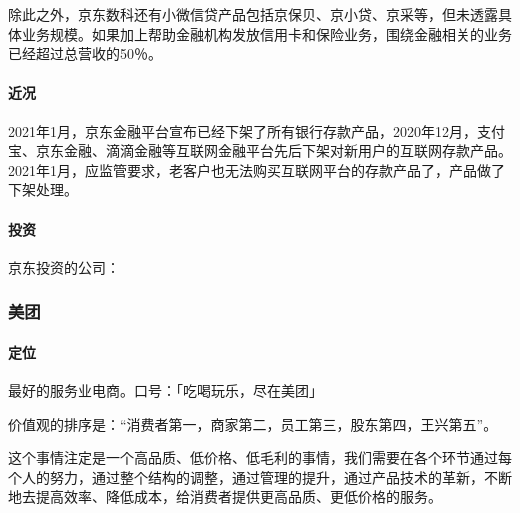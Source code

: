 \documentclass[letterpaper,10pt,english]{sphinxmanual}
\begin{document}
除此之外，京东数科还有小微信贷产品包括京保贝、京小贷、京采等，但未透露具体业务规模。如果加上帮助金融机构发放信用卡和保险业务，围绕金融相关的业务已经超过总营收的50％。%
\begin{footnote}[1024]\sphinxAtStartFootnote
{}
%
\end{footnote}


\paragraph{近况}
\label{\detokenize{chapter_AI_company/jd:id9}}
2021年1月，京东金融平台宣布已经下架了所有银行存款产品，2020年12月，支付宝、京东金融、滴滴金融等互联网金融平台先后下架对新用户的互联网存款产品。2021年1月，应监管要求，老客户也无法购买互联网平台的存款产品了，产品做了下架处理。%
\begin{footnote}[1025]\sphinxAtStartFootnote
{}
%
\end{footnote}


\paragraph{投资}
\label{\detokenize{chapter_AI_company/jd:id10}}
京东投资的公司：


\subsubsection{美团}
\label{\detokenize{chapter_AI_company/meituan:id1}}\label{\detokenize{chapter_AI_company/meituan::doc}}

\paragraph{定位}
\label{\detokenize{chapter_AI_company/meituan:id2}}
最好的服务业电商。口号：「吃喝玩乐，尽在美团」

价值观的排序是：“消费者第一，商家第二，员工第三，股东第四，王兴第五”。

这个事情注定是一个高品质、低价格、低毛利的事情，我们需要在各个环节通过每个人的努力，通过整个结构的调整，通过管理的提升，通过产品技术的革新，不断地去提高效率、降低成本，给消费者提供更高品质、更低价格的服务。
\end{document}
